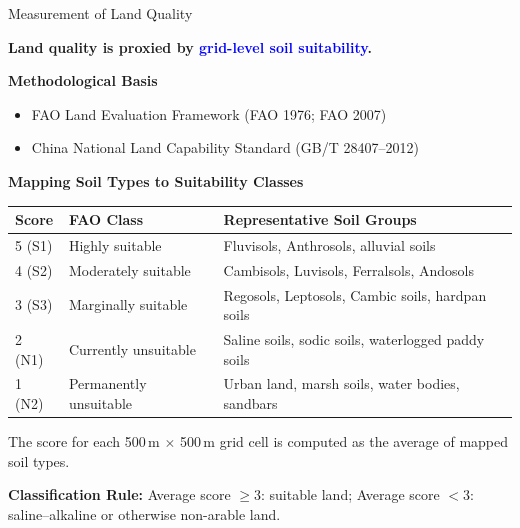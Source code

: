 \documentclass[10pt, xcolor=x11names,compress, aspectratio=169]{beamer}
\begin{document}
\begin{frame}{Measurement of Land Quality}

\textbf{Land quality is proxied by \textcolor{blue}{grid-level soil suitability}.}

\textbf{Methodological Basis}
\begin{itemize}
    \item FAO Land Evaluation Framework (FAO 1976; FAO 2007)
    \item China National Land Capability Standard (GB/T 28407--2012)
\end{itemize}

\medskip

\textbf{Mapping Soil Types to Suitability Classes}
\begin{table}[h!]
\centering
\small
\begin{tabular}{l l l}
\hline
\textbf{Score} & \textbf{FAO Class} & \textbf{Representative Soil Groups} \\
\hline
5 (S1) & Highly suitable 
& Fluvisols, Anthrosols, alluvial soils \\
4 (S2) & Moderately suitable 
& Cambisols, Luvisols, Ferralsols, Andosols \\
3 (S3) & Marginally suitable 
& Regosols, Leptosols, Cambic soils, hardpan soils \\
2 (N1) & Currently unsuitable 
& Saline soils, sodic soils, waterlogged paddy soils \\
1 (N2) & Permanently unsuitable 
& Urban land, marsh soils, water bodies, sandbars \\
\hline
\end{tabular}
\end{table}

\medskip

The score for each 500\,m $\times$ 500\,m grid cell is computed as the average of mapped soil types.

\textbf{Classification Rule:}  
Average score $\geq 3$: suitable land;  
Average score $< 3$: saline--alkaline or otherwise non-arable land.

\end{frame}
\end{document}
